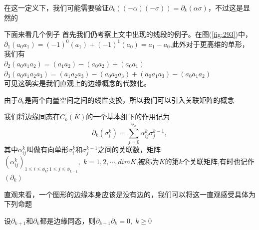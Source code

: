 \begin{remark}
在这一定义下，我们可能需要验证$\partial_{k}((-\alpha)(-\sigma))=\partial_{k}(\alpha\sigma)$，不过这是显然的
\end{remark}
下面来看几个例子
首先我们仍考察上文中出现的线段的例子。在图(\ref{fig:293})中，$\partial_{1}(a_{0}a_{1})=(-1)^{0}(a_{1})+(-1)^{1}(a_{0})=a_{1}-a_{0}$,此外对于更高维的单形，我们有\\
$\partial_{2}(a_{0}a_{1}a_{2})=(a_{1}a_{2})-(a_{0}a_{2})+(a_{0}a_{1})$\\
$\partial_{3}(a_{0}a_{1}a_{2}a_{3})=(a_{1}a_{2}a_{3})-(a_{0}a_{2}a_{3})+(a_{0}a_{1}a_{3})-(a_{0}a_{1}a_{2})$\\
可见这确实是我们直观上的边缘概念的代数化。

由于$\partial_{k}$是两个向量空间之间的线性变换，所以我们可以引入关联矩阵的概念
\begin{definition}
我们将边缘同态在$C_{k}(K)$的一个基本组下的作用记为
\begin{equation*}
    \partial_{k}(\sigma^{k}_{i})=\sum\limits_{j=0}^{\phi_{k}}\alpha^{k}_{ij}\sigma^{k-1}_{j},
\end{equation*}
其中$\alpha^{k}_{ij}$叫做有向单形$\sigma^{k}_{i}$和$\sigma^{k-1}_{j}$之间的关联数，矩阵$(\alpha^{k}_{ij})_{1\leq i\leq\phi_{k};1\leq j\leq\phi_{k-1}},\;k=1,2,\cdots,dimK$,被称为$K$的第$k$个关联矩阵,有时也记作$(\partial_{k})$
\end{definition}
直观来看，一个图形的边缘本身应该是没有边的，我们可以将这一直观感受具体为下列命题
\begin{proposition}
设$\partial_{k+1}$和$\partial_{k}$都是边缘同态，则$\partial_{k+1}\partial_{k}=0,\;k\geq 0$
\end{proposition}
